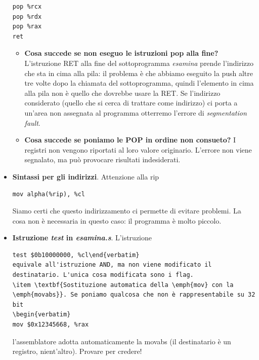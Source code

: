\documentclass[11pt]{report}
\theoremstyle{definition}
\begin{document}
\begin{itemize}
\begin{verbatim}
pop %rcx
pop %rdx
pop %rax
ret
\end{verbatim}
\begin{itemize}
\item \textbf{Cosa succede se non eseguo le istruzioni pop alla fine?} L'istruzione RET alla fine del sottoprogramma \emph{esamina} prende l'indirizzo che sta in cima alla pila: il problema è che abbiamo eseguito la push altre tre volte dopo la chiamata del sottoprogramma, quindi l'elemento in cima alla pila non è quello che dovrebbe usare la RET. Se l'indirizzo considerato (quello che si cerca di trattare come indirizzo) ci porta a un'area non assegnata al programma otterremo l'errore di \emph{segmentation fault}.
\item \textbf{Cosa succede se poniamo le POP in ordine non consueto?} I registri non vengono riportati al loro valore originario. L'errore non viene segnalato, ma può provocare risultati indesiderati.
\end{itemize}
\item \textbf{Sintassi per gli indirizzi}. Attenzione alla rip
\begin{verbatim}
mov alpha(%rip), %cl
\end{verbatim}
Siamo certi che questo indirizzamento ci permette di evitare problemi. La cosa non è necessaria in questo caso: il programma è molto piccolo.
\item \textbf{Istruzione \emph{test} in \emph{esamina.s}}. L'istruzione
\begin{verbatim}test $0b10000000, %cl\end{verbatim}
equivale all'istruzione AND, ma non viene modificato il destinatario. L'unica cosa modificata sono i flag. 
\item \textbf{Sostituzione automatica della \emph{mov} con la \emph{movabs}}. Se poniamo qualcosa che non è rappresentabile su 32 bit
\begin{verbatim}
mov $0x12345668, %rax
\end{verbatim}
l'assemblatore adotta automaticamente la movabs (il destinatario è un registro, nient'altro). Provare per credere!

\end{itemize}
\end{document}
